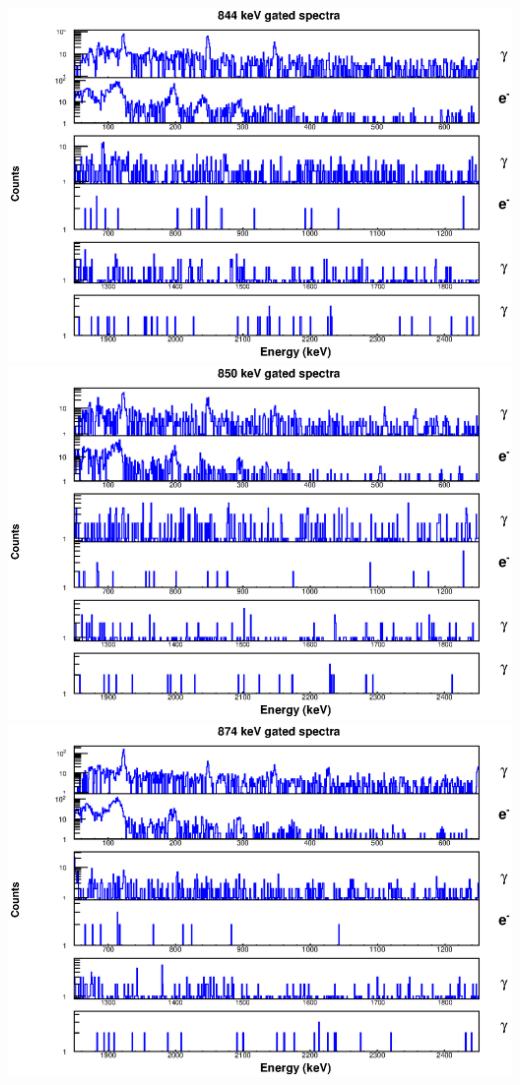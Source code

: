 \includegraphics[scale=0.8]{154Gd_Appendix/844_combined.eps}
\includegraphics[scale=0.8]{154Gd_Appendix/850_combined.eps}
\includegraphics[scale=0.8]{154Gd_Appendix/874_combined.eps}

